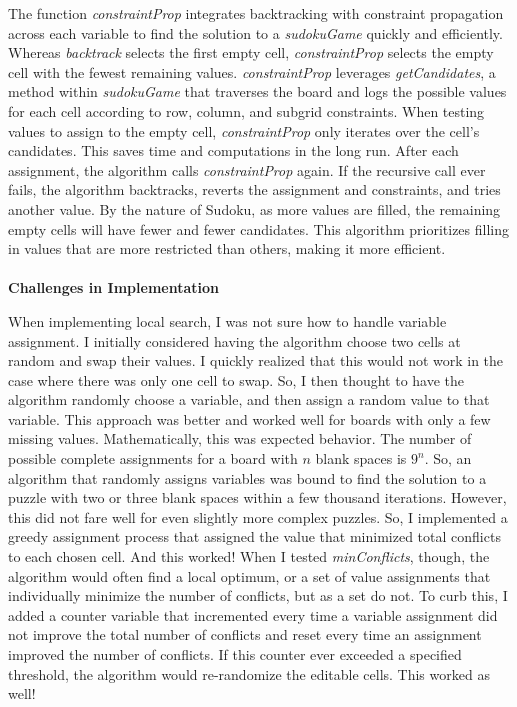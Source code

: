 \documentclass[12pt]{article}
\begin{document}
	The function \textit{constraintProp} integrates backtracking with constraint propagation across each variable to find the solution to a \textit{sudokuGame} quickly and efficiently. Whereas \textit{backtrack} selects the first empty cell, \textit{constraintProp} selects the empty cell with the fewest remaining values. \textit{constraintProp} leverages \textit{getCandidates}, a method within \textit{sudokuGame} that traverses the board and logs the possible values for each cell according to row, column, and subgrid constraints. When testing values to assign to the empty cell, \textit{constraintProp} only iterates over the cell's candidates. This saves time and computations in the long run. After each assignment, the algorithm calls \textit{constraintProp} again. If the recursive call ever fails, the algorithm backtracks, reverts the assignment and constraints, and tries another value. By the nature of Sudoku, as more values are filled, the remaining empty cells will have fewer and fewer candidates. This algorithm prioritizes filling in values that are more restricted than others, making it more efficient.\\\\
\textbf{Challenges in Implementation}
	
	When implementing local search, I was not sure how to handle variable assignment. I initially considered having the algorithm choose two cells at random and swap their values. I quickly realized that this would not work in the case where there was only one cell to swap. So, I then thought to have the algorithm randomly choose a variable, and then assign a random value to that variable. This approach was better and worked well for boards with only a few missing values. Mathematically, this was expected behavior. The number of possible complete assignments for a board with $n$ blank spaces is $9^n$. So, an algorithm that randomly assigns variables was bound to find the solution to a puzzle with two or three blank spaces within a few thousand iterations. However, this did not fare well for even slightly more complex puzzles. So, I implemented a greedy assignment process that assigned the value that minimized total conflicts to each chosen cell. And this worked! When I tested \textit{minConflicts}, though, the algorithm would often find a local optimum, or a set of value assignments that individually minimize the number of conflicts, but as a set do not. To curb this, I added a counter variable that incremented every time a variable assignment did not improve the total number of conflicts and reset every time an assignment improved the number of conflicts. If this counter ever exceeded a specified threshold, the algorithm would re-randomize the editable cells. This worked as well!
	
\end{document}
